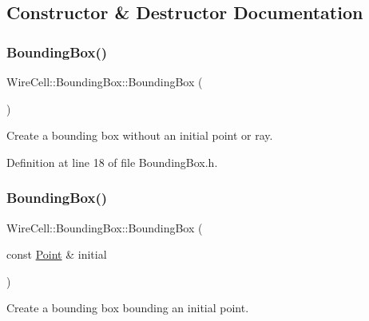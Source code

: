 \subsection{Constructor \& Destructor Documentation}
\mbox{\label{class_wire_cell_1_1_bounding_box_a7b87ed5ef66808aef4ad0d3c6b23482d}} 
\subsubsection{\texorpdfstring{Bounding\+Box()}{BoundingBox()}\hspace{0.1cm}{\footnotesize\ttfamily [1/4]}}
{\footnotesize\ttfamily Wire\+Cell\+::\+Bounding\+Box\+::\+Bounding\+Box (\begin{DoxyParamCaption}{ }\end{DoxyParamCaption})\hspace{0.3cm}{\ttfamily [inline]}}



Create a bounding box without an initial point or ray. 



Definition at line 18 of file Bounding\+Box.\+h.

\mbox{\label{class_wire_cell_1_1_bounding_box_a223a5a27ee7198e141c2c7da91292ddc}} 
\subsubsection{\texorpdfstring{Bounding\+Box()}{BoundingBox()}\hspace{0.1cm}{\footnotesize\ttfamily [2/4]}}
{\footnotesize\ttfamily Wire\+Cell\+::\+Bounding\+Box\+::\+Bounding\+Box (\begin{DoxyParamCaption}\item[{const \hyperlink{namespace_wire_cell_ab2b2565fa6432efbb4513c14c988cda9}{Point} \&}]{initial }\end{DoxyParamCaption})}



Create a bounding box bounding an initial point. 



